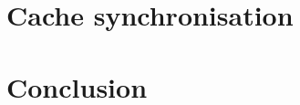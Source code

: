 \documentclass[pdftex,a4paper,12pt,twoside]{report}
\begin{document}
\chapter{Cache synchronisation}

\chapter{Conclusion}
\label{ch:conclusion}

\lipsum[76-80]





\listoffigures
\listoftables
\end{document}
